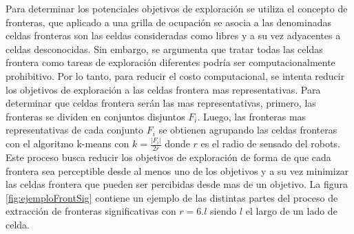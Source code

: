 Para determinar los potenciales objetivos de exploración se utiliza el concepto de fronteras, que aplicado a una grilla de ocupación se asocia a las denominadas celdas fronteras son las celdas consideradas como libres y a su vez adyacentes a celdas desconocidas. Sin embargo, se argumenta que tratar todas las celdas frontera como tareas de exploración diferentes podría ser computacionalmente prohibitivo. Por lo tanto, para reducir el costo computacional, se intenta reducir los objetivos de exploración a las celdas frontera mas representativas. Para determinar que celdas frontera serán las mas representativas, primero, las fronteras se dividen en conjuntos disjuntos $F_i$. Luego, las fronteras mas representativas de cada conjunto $F_i$ se obtienen agrupando las celdas fronteras con el algoritmo k-means con $k=\frac{|F_i|}{2r}$ donde $r$ es el radio de sensado del robots. Este proceso busca reducir los objetivos de exploración de forma de que cada frontera sea perceptible desde al menos uno de los objetivos y a su vez minimizar las celdas frontera que pueden ser percibidas desde mas de un objetivo. La figura \ref{fig:ejemploFrontSig} contiene un ejemplo de las distintas partes del proceso de extracción de fronteras significativas con $r=6.l$ siendo $l$ el largo de un lado de celda.
